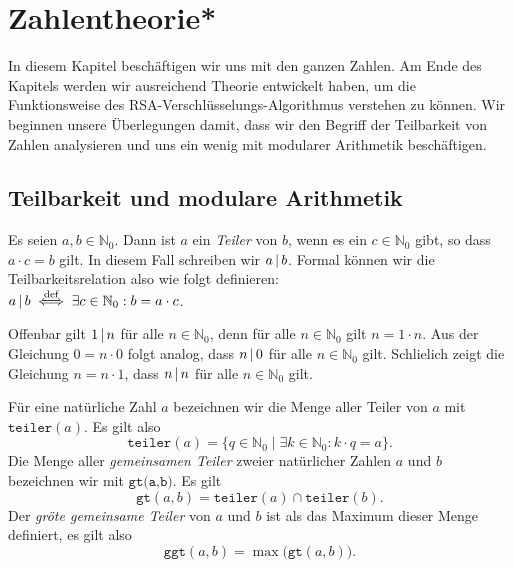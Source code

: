 \chapter{Zahlentheorie*}
In diesem Kapitel besch\"{a}ftigen wir uns mit den ganzen Zahlen.  Am Ende des Kapitels werden
wir ausreichend Theorie entwickelt haben, um die Funktionsweise des
RSA-Verschl\"{u}sselungs-Algorithmus verstehen zu k\"{o}nnen.  
Wir beginnen unsere \"{U}berlegungen damit, dass wir den Begriff der Teilbarkeit von Zahlen
analysieren und uns ein wenig mit modularer Arithmetik besch\"{a}ftigen.

\section{Teilbarkeit und modulare Arithmetik}

\begin{Definition}[Teiler]
  Es seien $a,b \in \mathbb{N}_0$.  Dann ist $a$ ein {\emph{\color{blue}Teiler}} von $b$, wenn es ein
  $c \in \mathbb{N}_0$ gibt, so dass $a \cdot c = b$ gilt.  In diesem Fall schreiben wir $a \,|\, b$.
  Formal k\"{o}nnen wir die Teilbarkeitsrelation also wie folgt definieren:
  \\[0.2cm]
  \hspace*{1.3cm}
  $a \,|\, b \;\stackrel{\mbox{\scriptsize def}}{\Longleftrightarrow}\; \exists c \in \mathbb{N}_0: b = a \cdot c$.
\end{Definition}

\remark
Offenbar gilt $1 \,|\, n$ f\"{u}r alle $n \in \mathbb{N}_0$, denn f\"{u}r alle $n \in \mathbb{N}_0$ gilt 
$n = 1 \cdot n$.   Aus der Gleichung $0 = n \cdot 0$ folgt analog, dass $n \,|\, 0$ f\"{u}r alle 
$n \in \mathbb{N}_0$ gilt.  Schlie\3lich zeigt die Gleichung $n = n \cdot 1$, dass $n \,|\, n$
f\"{u}r alle  $n \in \mathbb{N}_0$ gilt.
\vspace*{0.3cm}

F\"{u}r eine nat\"{u}rliche Zahl $a$ bezeichnen wir die Menge aller Teiler von $a$ mit
$\texttt{teiler}(a)$.  Es gilt also
\[ \texttt{teiler}(a) = \{ q \in \mathbb{N}_0 \mid \exists k \in \mathbb{N}_0: k \cdot q = a \}. \]
Die Menge aller {\emph{\color{blue}gemeinsamen Teiler}} zweier nat\"{u}rlicher Zahlen
$a$ und $b$ bezeichnen wir mit $\texttt{gt(a,b)}$.  Es gilt
\[ \texttt{gt}(a,b) = \texttt{teiler}(a) \cap \texttt{teiler}(b). \]
Der {\emph{\color{blue}gr\"{o}\3te gemeinsame Teiler}} von $a$ und $b$ ist als das Maximum dieser Menge definiert,
es gilt also 
\[ \texttt{ggt}(a,b) = \max\bigl(\texttt{gt}(a,b)\bigr). \]

